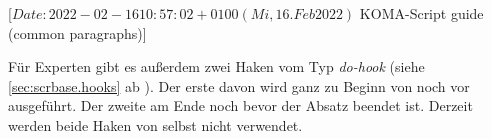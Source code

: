 %
%
%
%
%
%
%

%
                 [$Date: 2022-02-16 10:57:02 +0100 (Mi, 16. Feb 2022) $
                  KOMA-Script guide (common paragraphs)]

\begin{Declaration}
\end{Declaration}
%
Für Experten gibt es außerdem zwei
Haken vom Typ \emph{do-hook} (siehe \autoref{sec:scrbase.hooks} ab
). Der erste davon wird ganz zu Beginn von
 noch vor 
ausgeführt. Der zweite am Ende noch bevor der Absatz beendet ist. Derzeit
werden beide Haken von \KOMAScript{} selbst nicht verwendet.%
\EndIndexGroup


